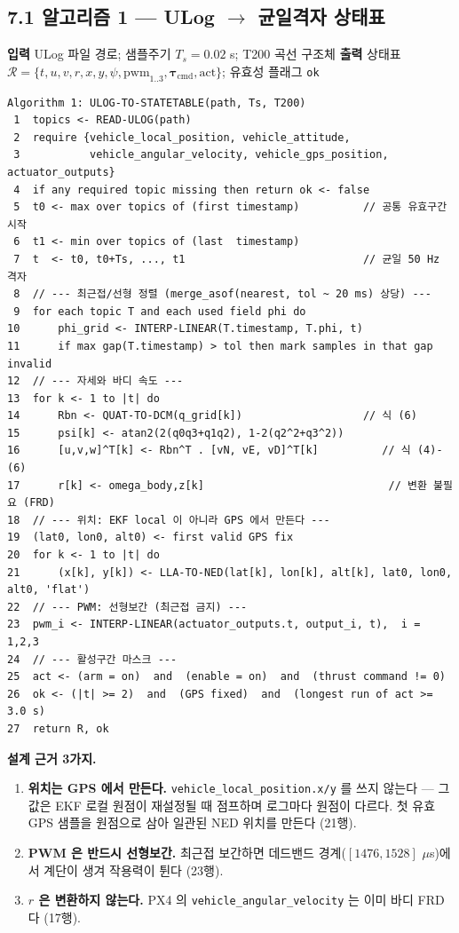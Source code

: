 \documentclass[10pt,a4paper]{article}
\begin{document}
\subsection*{7.1 알고리즘 1 --- ULog $\to$ 균일격자 상태표}

\textbf{입력} ULog 파일 경로; 샘플주기 $T_s = 0.02$ s; T200 곡선 구조체 \textbf{출력} 상태표 $\mathcal{R} = \{t, u, v, r, x, y, \psi, \mathrm{pwm}_{1..3}, \boldsymbol{\tau}_{\text{cmd}}, \text{act}\}$; 유효성 플래그 \texttt{ok}

\begin{Verbatim}[fontsize=\small,frame=single,framesep=2.2mm,rulecolor=\color{black!35}]
Algorithm 1: ULOG-TO-STATETABLE(path, Ts, T200)
 1  topics <- READ-ULOG(path)
 2  require {vehicle_local_position, vehicle_attitude,
 3           vehicle_angular_velocity, vehicle_gps_position, actuator_outputs}
 4  if any required topic missing then return ok <- false
 5  t0 <- max over topics of (first timestamp)          // 공통 유효구간 시작
 6  t1 <- min over topics of (last  timestamp)
 7  t  <- t0, t0+Ts, ..., t1                            // 균일 50 Hz 격자
 8  // --- 최근접/선형 정렬 (merge_asof(nearest, tol ~ 20 ms) 상당) ---
 9  for each topic T and each used field phi do
10      phi_grid <- INTERP-LINEAR(T.timestamp, T.phi, t)
11      if max gap(T.timestamp) > tol then mark samples in that gap invalid
12  // --- 자세와 바디 속도 ---
13  for k <- 1 to |t| do
14      Rbn <- QUAT-TO-DCM(q_grid[k])                   // 식 (6)
15      psi[k] <- atan2(2(q0q3+q1q2), 1-2(q2^2+q3^2))
16      [u,v,w]^T[k] <- Rbn^T . [vN, vE, vD]^T[k]          // 식 (4)-(6)
17      r[k] <- omega_body,z[k]                             // 변환 불필요 (FRD)
18  // --- 위치: EKF local 이 아니라 GPS 에서 만든다 ---
19  (lat0, lon0, alt0) <- first valid GPS fix
20  for k <- 1 to |t| do
21      (x[k], y[k]) <- LLA-TO-NED(lat[k], lon[k], alt[k], lat0, lon0, alt0, 'flat')
22  // --- PWM: 선형보간 (최근접 금지) ---
23  pwm_i <- INTERP-LINEAR(actuator_outputs.t, output_i, t),  i = 1,2,3
24  // --- 활성구간 마스크 ---
25  act <- (arm = on)  and  (enable = on)  and  (thrust command != 0)
26  ok <- (|t| >= 2)  and  (GPS fixed)  and  (longest run of act >= 3.0 s)
27  return R, ok
\end{Verbatim}

\textbf{설계 근거 3가지.}

\begin{enumerate}[leftmargin=1.5em,itemsep=2pt,parsep=2pt,topsep=3pt]
\item \textbf{위치는 GPS 에서 만든다.} \texttt{vehicle\_local\_position.x/y} 를 쓰지 않는다 --- 그 값은 EKF 로컬 원점이 재설정될 때 점프하며 로그마다 원점이 다르다. 첫 유효 GPS 샘플을 원점으로 삼아 일관된 NED 위치를 만든다 (21행).
\item \textbf{PWM 은 반드시 선형보간.} 최근접 보간하면 데드밴드 경계($[1476,1528]$ $\mu$s)에서 계단이 생겨 작용력이 튄다 (23행).
\item \textbf{$r$ 은 변환하지 않는다.} PX4 의 \texttt{vehicle\_angular\_velocity} 는 이미 바디 FRD 다 (17행).
\end{enumerate}
\end{document}
